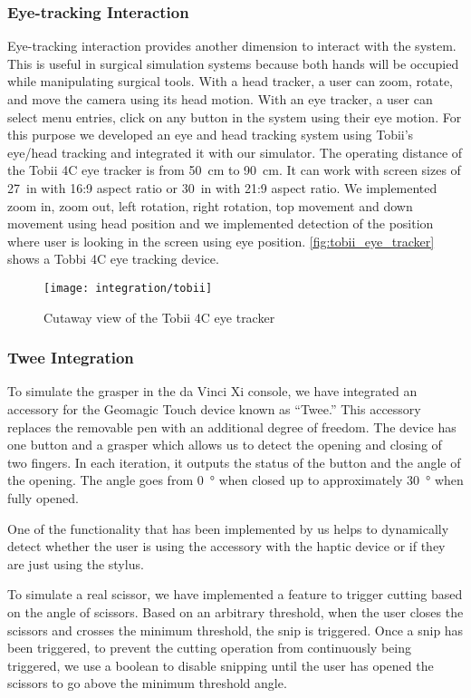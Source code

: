 \subsubsection{Eye-tracking Interaction}
Eye-tracking interaction provides another dimension to interact with the system. This is useful in surgical simulation systems because both hands will be occupied while manipulating surgical tools. With a head tracker, a user can zoom, rotate, and move the camera using its head motion. With an eye tracker, a user can select menu entries, click on any button in the system using their eye motion. For this purpose we developed an eye and head tracking system using Tobii's eye/head tracking  and integrated it with our simulator. The operating distance of the Tobii 4C eye tracker is from \SI{50}{\centi\metre} to \SI{90}{\centi\metre}. It can work with screen sizes of \SI{27}{in} with 16:9 aspect ratio or \SI{30}{in} with 21:9 aspect ratio. We implemented zoom in, zoom out, left rotation, right rotation, top movement and down movement using head position and we implemented detection of the position where user is looking in the screen using eye position. \autoref{fig:tobii_eye_tracker} shows a Tobbi 4C eye tracking device.

\begin{figure}
  \centering
  \texttt{[image: integration/tobii]}
  \caption{Cutaway view of the Tobii 4C eye tracker}
  \label{fig:tobii_eye_tracker}
\end{figure}

\subsubsection{Twee Integration}
To simulate the grasper in the da Vinci Xi console, we have integrated an accessory for the Geomagic Touch device known as \enquote{Twee.} This accessory replaces the removable pen with an additional degree of freedom. The device has one button and a grasper which allows us to detect the opening and closing of two fingers. In each iteration, it outputs the status of the button and the angle of the opening. The angle goes from \SI{0}{\degree} when closed up to approximately \SI{30}{\degree} when fully opened.

One of the functionality that has been implemented by us helps to dynamically detect whether the user is using the accessory with the haptic device or if they are just using the stylus.

To simulate a real scissor, we have implemented a feature to trigger cutting based on the angle of scissors. Based on an arbitrary threshold, when the user closes the scissors and crosses the minimum threshold, the snip is triggered. Once a snip has been triggered, to prevent the cutting operation from continuously being triggered, we use a boolean to disable snipping until the user has opened the scissors to go above the minimum threshold angle.

